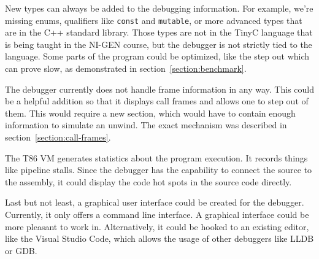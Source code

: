 New types can always be added to the debugging information. For example, we're
missing enums, qualifiers like \texttt{const} and \texttt{mutable}, or more
advanced types that are in the C++ standard library. Those types are not in the
TinyC language that is being taught in the NI-GEN course, but the debugger is
not strictly tied to the language. Some parts of the program could be
optimized, like the step out which can prove slow, as demonstrated in
section~\ref{section:benchmark}.

The debugger currently does not handle frame information in any way. This could
be a helpful addition so that it displays call frames and allows one to step
out of them. This would require a new section, which would have to contain
enough information to simulate an unwind. The exact mechanism was described in
section~\ref{section:call-frames}.

The T86 VM generates statistics about the program execution. It records things
like pipeline stalls. Since the debugger has the capability to connect the
source to the assembly, it could display the code hot spots in the source code
directly.

Last but not least, a graphical user interface could be created for the
debugger. Currently, it only offers a command line interface. A graphical
interface could be more pleasant to work in. Alternatively, it could be hooked
to an existing editor, like the Visual Studio Code, which allows the usage of
other debuggers like LLDB or GDB.
